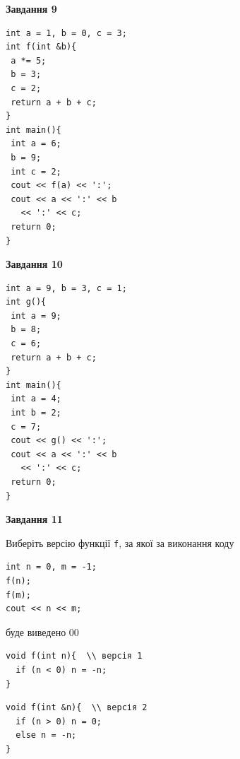 \documentclass[12pt, ukrainian]{article}
\def\code#1{\Verb!#1!}
\begin{document}
{\begin {large}
\begin{minipage}[t]{11.0cm}
\end{minipage}


\begin{minipage}[t]{7.0cm}

\begin{center}
\textbf{Завдання 9}
\end{center}
\vspace{-8mm}

\begin{verbatim}
int a = 1, b = 0, c = 3;
int f(int &b){
 a *= 5;
 b = 3;
 c = 2;
 return a + b + c;
}
int main(){
 int a = 6;
 b = 9;
 int c = 2;
 cout << f(a) << ':';
 cout << a << ':' << b 
   << ':' << c;
 return 0;
}
\end{verbatim}



\begin{center}
\textbf{Завдання 10}
\end{center}
\vspace{-8mm}

\begin{verbatim}
int a = 9, b = 3, c = 1;
int g(){
 int a = 9;
 b = 8;
 c = 6;
 return a + b + c;
}
int main(){
 int a = 4;
 int b = 2;
 c = 7;
 cout << g() << ':';
 cout << a << ':' << b 
   << ':' << c;
 return 0;
}
\end{verbatim}

\end{minipage}
\vline \hspace{1mm}
\begin{minipage}[t]{11.0cm}

\begin{center}
\textbf{Завдання 11}
\end{center}
Виберіть версію функції \code{f}, за якої за виконання коду
\begin{verbatim}
int n = 0, m = -1;
f(n);
f(m);
cout << n << m;
\end{verbatim}

буде виведено 00

\begin{verbatim}
void f(int n){  \\ версія 1
  if (n < 0) n = -n;
}
\end{verbatim}

\vspace{-8mm}\begin{verbatim}
void f(int &n){  \\ версія 2
  if (n > 0) n = 0;
  else n = -n;
}
\end{verbatim}


\end{minipage}
\end{large}}
\end{document}

